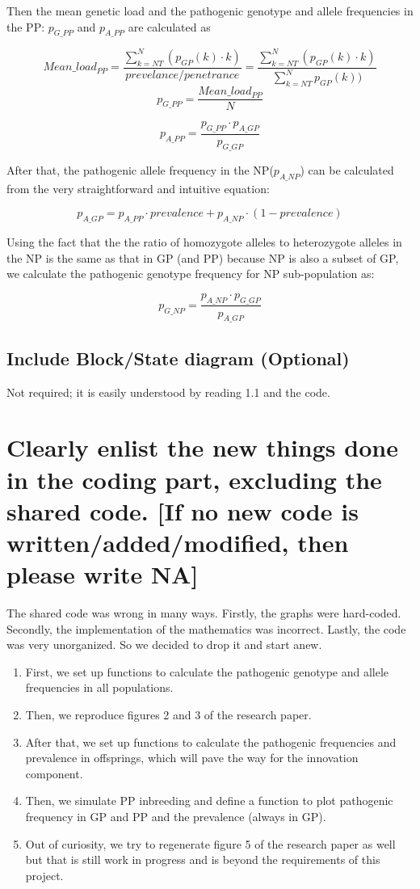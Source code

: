 \documentclass{article}
\begin{document}
Then the mean genetic load and the pathogenic genotype and allele frequencies in the PP: $p_{G\_PP}$ and $p_{A\_PP}$ are calculated as
  
$$Mean\_load_{PP}=\frac{\sum_{k=NT}^{N} (p_{GP}(k)\cdot k)}{prevelance/penetrance}=\frac{\sum_{k=NT}^{N} (p_{GP}(k)\cdot k)}{\sum_{k=NT}^{N} p_{GP}(k))}$$
$$ p_{G\_PP} = \frac{Mean\_load_{PP}}{N}$$
  
$$p_{A\_PP} = \frac {p_{G\_PP} \cdot p_{A\_GP}}{p_{G\_GP}}$$
  
After that, the pathogenic allele frequency in the NP($p_{A\_NP}$) can be calculated from the very straightforward and intuitive equation:
  
$$p_{A\_GP}=  p_{A\_PP} \cdot prevalence +p_{A\_NP} \cdot (1- prevalence)$$
  
Using the fact that the the ratio of homozygote alleles to heterozygote alleles in the NP is the same as that in GP (and PP) because NP is also a subset of GP, we calculate the pathogenic genotype frequency for NP sub-population as:
  
$$p_{G\_NP} = \frac {p_{A\_NP} \cdot p_{G\_GP}}{p_{A\_GP}}$$
  
\subsection{Include Block/State diagram (Optional)}
Not required; it is easily understood by reading 1.1 and the code.

\section{Clearly enlist the new things done in the coding part, excluding the shared code. [If no new code is written/added/modified, then please write NA]}
The shared code was wrong in many ways. Firstly, the graphs were hard-coded. Secondly, the implementation of the mathematics was incorrect. Lastly, the code was very unorganized. So we decided to drop it and start anew.
\begin{enumerate}
    \item
    First, we set up functions to calculate the pathogenic genotype and allele frequencies in all populations.
    \item
    Then, we reproduce figures 2 and 3 of the research paper.
    \item
    After that, we set up functions to calculate the pathogenic frequencies and prevalence in offsprings, which will pave the way for the innovation component.
    \item
    Then, we simulate PP inbreeding and define a function to plot pathogenic frequency in GP and PP and the prevalence (always in GP).
    \item
    Out of curiosity, we try to regenerate figure 5 of the research paper as well but that is still work in progress and is beyond the requirements of this project.
\end{enumerate}
\end{document}
